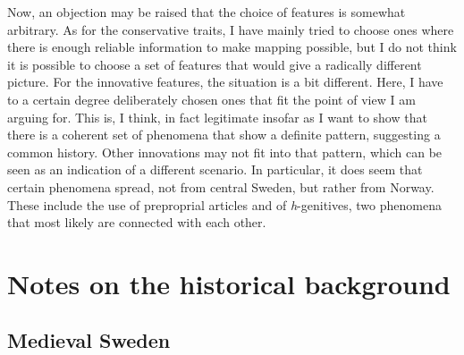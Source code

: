 \begin{styleBodytextC}
Now, an objection may be raised that the choice of features is somewhat arbitrary. As for the conservative traits, I have mainly tried to choose ones where there is enough reliable information to make mapping possible, but I do not think it is possible to choose a set of features that would give a radically different picture. For the innovative features, the situation is a bit different. Here, I have to a certain degree deliberately chosen ones that fit the point of view I am arguing for. This is, I think, in fact legitimate insofar as I want to show that there is a coherent set of phenomena that show a definite pattern, suggesting a common history. Other innovations may not fit into that pattern, which can be seen as an indication of a different scenario. In particular, it does seem that certain phenomena spread, not from central Sweden, but rather from Norway. These include the use of preproprial articles and of \textit{h}{}-genitives, two phenomena that most likely are connected with each other. 

\end{styleBodytextC}

\section{\rmfamily\bfseries Notes on the historical background}
\subsection{\rmfamily Medieval Sweden}

